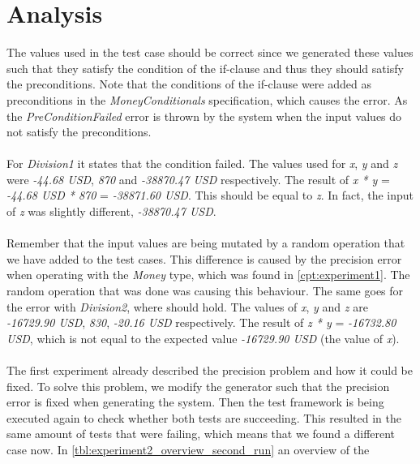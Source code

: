 \section{Analysis}
\label{sct:experiment2_analysis}
The values used in the test case should be correct since we generated these
values such that they satisfy the condition of the if-clause and thus they
should satisfy the preconditions. Note that the conditions of the if-clause were
added as preconditions in the \textit{MoneyConditionals} specification, which
causes the error. As the \textit{PreConditionFailed} error is thrown by the
system when the input values do not satisfy the preconditions.\\
\\
For \textit{Division1} it states that the condition  failed. The
values used for \textit{x}, \textit{y} and \textit{z} were \textit{-44.68 USD},
\textit{870} and \textit{-38870.47 USD} respectively. The result of
\textit{x * y} = \textit{-44.68 USD * 870} = \textit{-38871.60 USD}. This should
be equal to \textit{z}. In fact, the input of \textit{z} was slightly different,
\textit{-38870.47 USD}.\\
\\
Remember that the input values are being mutated by a random operation that we
have added to the test cases. This difference is caused by the precision error
when operating with the \textit{Money} type, which was found in
\autoref{cpt:experiment1}. The random operation that was done was causing this
behaviour. The same goes for the error with \textit{Division2}, where
 should hold. The values of \textit{x}, \textit{y} and \textit{z}
are \textit{-16729.90 USD}, \textit{830}, \textit{-20.16 USD} respectively. The
result of \textit{z * y} = \textit{-16732.80 USD}, which is not equal to
the expected value \textit{-16729.90 USD} (the value of \textit{x}).\\
\\
The first experiment already described the precision problem and how it could
be fixed. To solve this problem, we modify the generator such that the precision
error is fixed when generating the system. Then the test framework is being
executed again to check whether both tests are succeeding. This resulted in the
same amount of tests that were failing, which means that we found a different
case now. In \autoref{tbl:experiment2_overview_second_run} an overview of the
